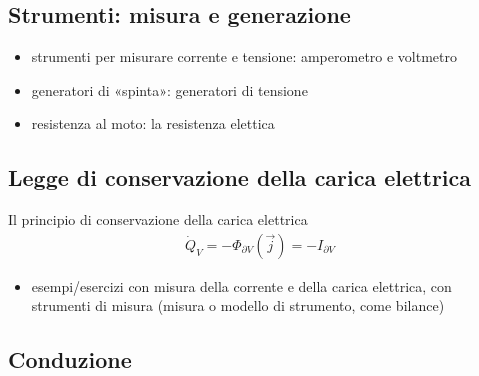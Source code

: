 \documentclass[letterpaper,10pt,italian]{jupyterBook}
\begin{document}
\subsection{Strumenti: misura e generazione}
\label{\detokenize{ch/electromagnetism/electric-current:strumenti-misura-e-generazione}}
\sphinxAtStartPar
{}
\begin{itemize}
\item {} 
\sphinxAtStartPar
strumenti per misurare corrente e tensione: amperometro e voltmetro

\item {} 
\sphinxAtStartPar
generatori di «spinta»: generatori di tensione

\item {} 
\sphinxAtStartPar
resistenza al moto: la resistenza elettica

\end{itemize}


\subsection{Legge di conservazione della carica elettrica}
\label{\detokenize{ch/electromagnetism/electric-current:legge-di-conservazione-della-carica-elettrica}}
\sphinxAtStartPar
Il principio di conservazione della carica elettrica
\begin{equation*}
\begin{split}\dot{Q}_V = - \Phi_{\partial V}(\vec{j}) = - I_{\partial V}\end{split}
\end{equation*}\begin{itemize}
\item {} 
\sphinxAtStartPar
{} esempi/esercizi con misura della corrente e della carica elettrica, con strumenti di misura (misura o modello di strumento, come bilance)

\end{itemize}


\subsection{Conduzione}
\label{\detokenize{ch/electromagnetism/electric-current:conduzione}}
\end{document}
